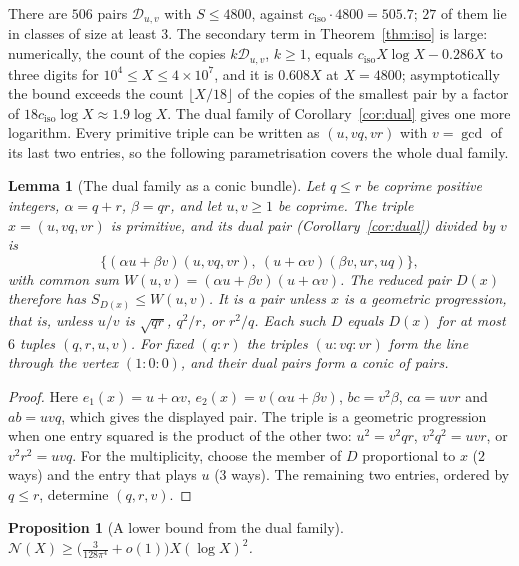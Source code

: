 \documentclass[11pt]{amsart}
\newtheorem{proposition}[theorem]{Proposition}
\newtheorem{lemma}[theorem]{Lemma}
\theoremstyle{definition}
\theoremstyle{remark}
\newcommand{\N}{\mathcal{N}}
\newcommand{\ciso}{c_{\mathrm{iso}}}
\begin{document}
There are $506$ pairs $\mathcal D_{u,v}$ with $S\le4800$, against $\ciso\cdot4800=505.7$; $27$ of them lie in classes of size at least $3$. The secondary term in Theorem~\ref{thm:iso} is large: numerically, the count of the copies $k\mathcal D_{u,v}$, $k\ge1$, equals $\ciso X\log X-0.286X$ to three digits for $10^4\le X\le4\times10^7$, and it is $0.608X$ at $X=4800$; asymptotically the bound exceeds the count $\lfloor X/18\rfloor$ of the copies of the smallest pair by a factor of $18\ciso\log X\approx1.9\log X$. The dual family of Corollary~\ref{cor:dual} gives one more logarithm. Every primitive triple can be written as $(u,vq,vr)$ with $v=\gcd$ of its last two entries, so the following parametrisation covers the whole dual family.

\begin{lemma}[The dual family as a conic bundle]\label{lem:conic}
Let $q\le r$ be coprime positive integers, $\alpha=q+r$, $\beta=qr$, and let $u,v\ge1$ be coprime. The triple $x=(u,vq,vr)$ is primitive, and its dual pair (Corollary~\ref{cor:dual}) divided by $v$ is
\[
  \big\{(\alpha u+\beta v)(u,vq,vr),\ (u+\alpha v)(\beta v,ur,uq)\big\},
\]
with common sum $W(u,v)=(\alpha u+\beta v)(u+\alpha v)$. The reduced pair $D(x)$ therefore has $S_{D(x)}\le W(u,v)$. It is a pair unless $x$ is a geometric progression, that is, unless $u/v$ is $\sqrt{qr}$, $q^2/r$, or $r^2/q$. Each such $D$ equals $D(x)$ for at most $6$ tuples $(q,r,u,v)$. For fixed $(q:r)$ the triples $(u:vq:vr)$ form the line through the vertex $(1:0:0)$, and their dual pairs form a conic of pairs.
\end{lemma}

\begin{proof}
Here $e_1(x)=u+\alpha v$, $e_2(x)=v(\alpha u+\beta v)$, $bc=v^2\beta$, $ca=uvr$ and $ab=uvq$, which gives the displayed pair. The triple is a geometric progression when one entry squared is the product of the other two: $u^2=v^2qr$, $v^2q^2=uvr$, or $v^2r^2=uvq$. For the multiplicity, choose the member of $D$ proportional to $x$ ($2$ ways) and the entry that plays $u$ ($3$ ways). The remaining two entries, ordered by $q\le r$, determine $(q,r,v)$.
\end{proof}

\begin{proposition}[A lower bound from the dual family]\label{thm:loglog}
$\N(X)\ge\big(\frac3{128\pi^4}+o(1)\big)X(\log X)^2$.
\end{proposition}
\end{document}
